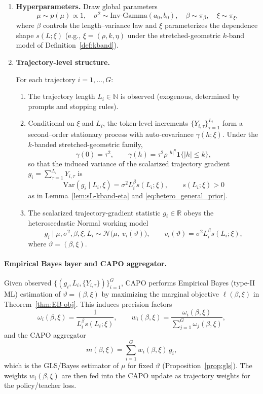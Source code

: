 \documentclass[12pt]{cs}
\theoremstyle{remark}
\begin{document}
\begin{enumerate}
  \item \textbf{Hyperparameters.}
  Draw global parameters
  \[
    \mu \sim p(\mu)\propto 1,\quad
    \sigma^2 \sim \mathrm{Inv\text{-}Gamma}(a_0,b_0),\quad
    \beta \sim \pi_\beta,\quad
    \xi \sim \pi_\xi,
  \]
  where \(\beta\) controls the length–variance law and \(\xi\) parameterizes the dependence shape \(s(L;\xi)\) (e.g., \(\xi=(\rho,k,\eta)\) under the stretched-geometric $k$-band model of Definition~\ref{def:kband}).
  \item \textbf{Trajectory-level structure.}

  For each trajectory \(i=1,\dots,G\):
  \begin{enumerate}
    \item The trajectory length \(L_i\in\mathbb N\) is observed (exogenous, determined by prompts and stopping rules).
    \item Conditional on \(\xi\) and \(L_i\), the token-level increments \(\{Y_{i,\tau}\}_{\tau=1}^{L_i}\) form a second–order stationary process with auto-covariance \(\gamma(h;\xi)\). Under the $k$-banded stretched-geometric family,
    \[
      \gamma(0)=\tau^2,\qquad
      \gamma(h)=\tau^2\rho^{\,|h|^{\eta}}\mathbf 1\{|h|\le k\},
    \]
    so that the induced variance of the scalarized trajectory gradient \(g_i=\sum_{\tau=1}^{L_i} Y_{i,\tau}\) is
    \[
      \mathrm{Var}(g_i\mid L_i,\xi)=\sigma^2 L_i^{\beta} s(L_i;\xi),
      \qquad
      s(L_i;\xi)>0
    \]
    as in Lemma~\ref{lem:sL-kband-eta} and \eqref{eq:hetero_general_prior}.
    \item The scalarized trajectory-gradient statistic \(g_i\in\mathbb R\) obeys the heteroscedastic Normal working model
    \[
      g_i \mid \mu,\sigma^2,\beta,\xi,L_i \sim
      \mathcal N\!\big(\mu,\ v_i(\vartheta)\big),\qquad
      v_i(\vartheta)=\sigma^2 L_i^{\beta} s(L_i;\xi),
    \]
    where \(\vartheta=(\beta,\xi)\).
  \end{enumerate}
\end{enumerate}

\paragraph{Empirical Bayes layer and CAPO aggregator.}
Given observed \(\{(g_i,L_i,\{Y_{i,\tau}\})\}_{i=1}^G\), CAPO performs Empirical Bayes (type-II ML) estimation of \(\vartheta=(\beta,\xi)\) by maximizing the marginal objective \(\ell(\beta,\xi)\) in Theorem~\ref{thm:EB-obj}.
This induces precision factors
\[
  \omega_i(\beta,\xi)
  = \frac{1}{L_i^{\beta} s(L_i;\xi)},\qquad
  w_i(\beta,\xi)
  = \frac{\omega_i(\beta,\xi)}{\sum_{j=1}^G \omega_j(\beta,\xi)},
\]
and the CAPO aggregator
\[
  m(\beta,\xi) = \sum_{i=1}^G w_i(\beta,\xi)\,g_i,
\]
which is the GLS/Bayes estimator of \(\mu\) for fixed \(\vartheta\) (Proposition~\ref{prop:gls}).
The weights \(w_i(\beta,\xi)\) are then fed into the CAPO update as trajectory weights for the policy/teacher loss.
\end{document}
